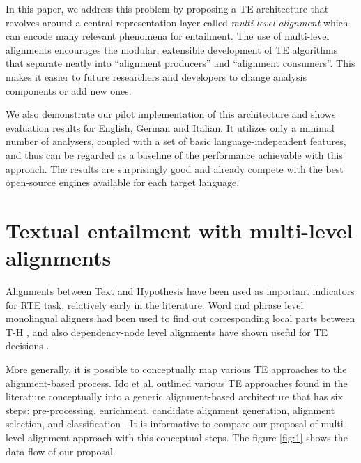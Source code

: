 \documentclass[11pt,letterpaper]{article}
\begin{document}
In this paper, we address this problem by proposing a TE architecture
that revolves around a central representation layer called {\em
  multi-level alignment} which can encode many relevant phenomena for
entailment. The use of multi-level alignments encourages the modular,
extensible development of TE algorithms that separate neatly into
``alignment producers'' and ``alignment consumers''. This makes it
easier to future researchers and developers to change analysis
components or add new ones. 

We also demonstrate our pilot implementation of this architecture and
shows evaluation results for English, German and Italian. It utilizes
only a minimal number of analysers, coupled with a set of basic
language-independent features, and thus can be regarded as a baseline
of the performance achievable with this approach.  The results are
surprisingly good and already compete with the best open-source
engines available for each target language.

\section{Textual entailment with multi-level alignments}
Alignments between Text and Hypothesis have been used as important
indicators for RTE task, relatively early in the literature. Word and
phrase level monolingual aligners had been used to find out
corresponding local parts between T-H \cite{}, and also
dependency-node level alignments have shown useful for TE decisions
\cite{}.      

More generally, it is possible to conceptually map various TE
approaches to the alignment-based process. Ido et al. outlined various
TE approaches found in the literature conceptually into a generic
alignment-based architecture that has six steps: pre-processing,
enrichment, candidate alignment generation, alignment selection, and
classification \cite{}.   
It is informative to compare our proposal of multi-level alignment 
approach with this conceptual steps. The figure \ref{fig:1} shows the
data flow of our proposal. 
\end{document}
